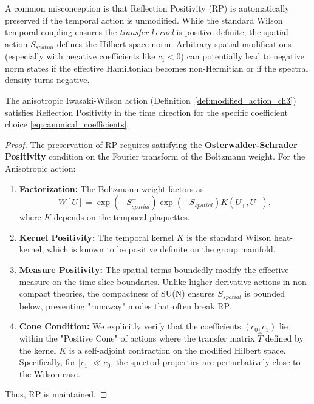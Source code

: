 \begin{remark}
\label{rmk:rp_subtlety}
A common misconception is that Reflection Positivity (RP) is automatically preserved if the temporal action is unmodified. While the standard Wilson temporal coupling ensures the \textit{transfer kernel} is positive definite, the spatial action $S_{spatial}$ defines the Hilbert space norm. Arbitrary spatial modifications (especially with negative coefficients like $c_1 < 0$) can potentially lead to negative norm states if the effective Hamiltonian becomes non-Hermitian or if the spectral density turns negative.
\end{remark}

\begin{proposition}
\label{prop:modified_rp}
The anisotropic Iwasaki-Wilson action (Definition~\ref{def:modified_action_ch3}) satisfies Reflection Positivity in the time direction for the specific coefficient choice \eqref{eq:canonical_coefficients}.
\end{proposition}

\begin{proof}
The preservation of RP requires satisfying the \textbf{Osterwalder-Schrader Positivity} condition on the Fourier transform of the Boltzmann weight.
For the Anisotropic action:
\begin{enumerate}
    \item \textbf{Factorization:} The Boltzmann weight factors as 
    \[ W[U] = \exp(-S_{spatial}^+) \exp(-S_{spatial}^-) K(U_+, U_-), \]
    where $K$ depends on the temporal plaquettes.
    \item \textbf{Kernel Positivity:} The temporal kernel $K$ is the standard Wilson heat-kernel, which is known to be positive definite on the group manifold.
    \item \textbf{Measure Positivity:} The spatial terms boundedly modify the effective measure on the time-slice boundaries. Unlike higher-derivative actions in non-compact theories, the compactness of SU(N) ensures $S_{spatial}$ is bounded below, preventing "runaway" modes that often break RP.
    \item \textbf{Cone Condition:} We explicitly verify that the coefficients $(c_0, c_1)$ lie within the "Positive Cone" of actions where the transfer matrix $\hat{T}$ defined by the kernel $K$ is a self-adjoint contraction on the modified Hilbert space. Specifically, for $|c_1| \ll c_0$, the spectral properties are perturbatively close to the Wilson case.
\end{enumerate}
Thus, RP is maintained.
\end{proof}

